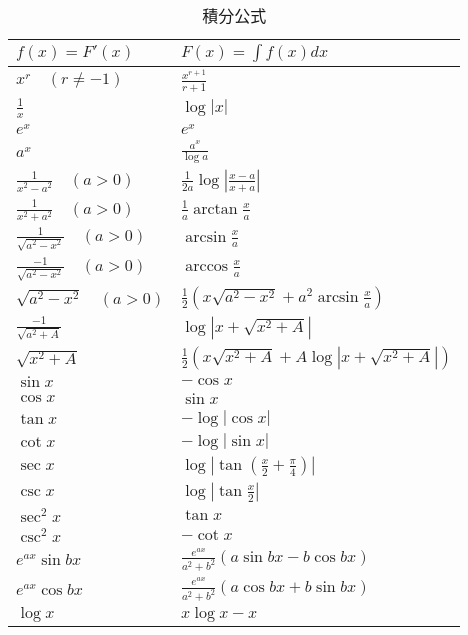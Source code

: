\documentclass[dvipdfmx,a4j,10pt]{jsarticle}
\theoremstyle{mystyle1}
\theoremstyle{mystyle2}
\begin{document}
\begin{table}[h]
\begin{center}
{\renewcommand\arraystretch{1.6}
 \small
\begin{tabular}{p{15em}|l} \hline
$f(x)=F'(x)$ & $F(x)=\int f(x) dx$ \\ \hline \hline
$x^r\quad(r\neq -1)$ & $\displaystyle\frac{x^{r+1}}{r+1}$ \\
$\displaystyle \frac{1}{x}$ & $\log{|x|}$ \\
$e^x$ & $e^x$\\
$a^x$ & $\displaystyle \frac{a^x}{\log{a}}$\\
$\displaystyle \frac{1}{x^2-a^2}\quad(a>0)$ & $\displaystyle \frac{1}{2a}\log\left|\frac{x-a}{x+a}\right|$\\
$\displaystyle \frac{1}{x^2+a^2}\quad(a>0)$ & $\displaystyle \frac{1}{a}\arctan{\frac{x}{a}}$\\
$\displaystyle \frac{1}{\sqrt{a^2-x^2}}\quad(a>0)$ & $\displaystyle \arcsin{\frac{x}{a}}$\\
$\displaystyle \frac{-1}{\sqrt{a^2-x^2}}\quad(a>0)$ & $\displaystyle \arccos{\frac{x}{a}}$\\
$\sqrt{a^2-x^2}\quad(a>0)$ & $\displaystyle\frac{1}{2}\left(x\sqrt{a^2-x^2}+a^2\arcsin{\frac{x}{a}}\right)$\\
$\displaystyle \frac{-1}{\sqrt{a^2+A}}$ & $\displaystyle\log\left|x+\sqrt{x^2+A}\right|$\\
$\sqrt{x^2+A}$ & $\displaystyle\frac{1}{2}\left(x\sqrt{x^2+A}+A\log\left|x+\sqrt{x^2+A}\right|\right)$\\
$\sin{x}$ & $-\cos{x}$\\
$\cos{x}$ & $\sin{x}$\\
$\tan{x}$ & $-\log|\cos x|$\\
$\cot{x}$ & $-\log|\sin x|$\\
$\sec{x}$ & $\displaystyle\log\left|\tan\left(\frac{x}{2}+\frac{\pi}{4}\right)\right|$\\
$\csc{x}$ & $\displaystyle\log\left|\tan\frac{x}{2}\right|$\\
$\sec^2 x$ & $\tan{x}$\\
$\csc^2 x$ & $-\cot{x}$\\
$e^{ax}\sin bx$ & $\displaystyle\frac{e^{ax}}{a^2+b^2}(a\sin bx-b\cos bx)$\\
$e^{ax}\cos bx$ & $\displaystyle\frac{e^{ax}}{a^2+b^2}(a\cos bx+b\sin bx)$\\
$\log x$ & $x\log x-x$\\ \hline
\end{tabular}
}
\caption{積分公式}
\end{center}
\end{table}
\end{document}
